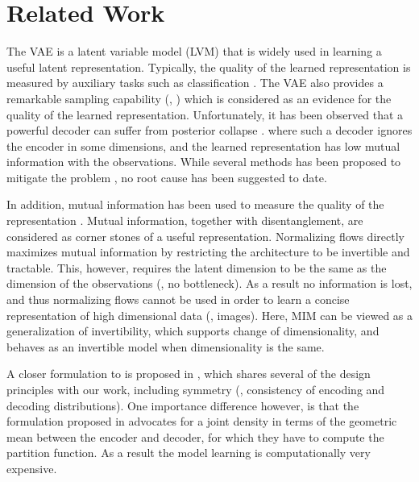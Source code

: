 
\section{Related Work}
\label{sec:related-work}

The VAE \cite{Kingma2013} is a latent variable model (LVM) that is widely used in learning a useful latent representation.
Typically, the quality of the learned representation is measured by auxiliary tasks such as classification \cite{DBLP:journals/corr/BengioTPPB17}.
The VAE also provides a remarkable sampling capability (\eg, \cite{DBLP:journals/corr/abs-1901-03416}) which is considered as an evidence for 
the quality of the learned representation. Unfortunately, it has been observed that a powerful decoder
can suffer from posterior collapse \citep{DBLP:journals/corr/BowmanVVDJB15,ChenKSDDSSA16,
DBLP:journals/corr/abs-1901-03416,DBLP:journals/corr/OordKK16,
DBLP:journals/corr/abs-1711-00937}. where such a decoder ignores the encoder in some dimensions, 
and the learned representation has low mutual information with the observations.
While several methods has been proposed to mitigate the problem \cite{DBLP:journals/corr/abs-1711-00464, DBLP:journals/corr/abs-1901-03416}, no root cause has been suggested to date.

In addition, mutual information has been used to measure the quality of the representation \cite{Hjelm2018,hjelm2018learning}. Mutual information, together with disentanglement, are considered as corner stones 
of a useful representation. Normalizing flows \cite{Rezende2015,Dinh2014,Dinh2016a,Kingma2018,DBLP:journals/corr/abs-1902-00275} directly maximizes mutual information
by restricting the architecture to be invertible and tractable. This, however, requires the latent dimension to be the same as the dimension of the observations (\ie, no bottleneck).
As a result no information is lost, and thus normalizing flows cannot be used in order to learn a concise representation of high dimensional data (\eg, images). Here, MIM can be viewed as a generalization of invertibility, which supports change of dimensionality, and behaves as an invertible model when dimensionality is the same.

A closer formulation to \MIM is proposed in \cite{DBLP:journals/corr/BornscheinSFB15}, which shares several of the design
principles with our work, including symmetry (\ie, consistency of encoding and decoding distributions). 
One importance difference however, is that the formulation proposed in \cite{DBLP:journals/corr/BornscheinSFB15} advocates for a joint density
in terms of the geometric mean between the encoder and decoder, for which they have to 
compute the partition function.  As a result the model learning is computationally very expensive.

